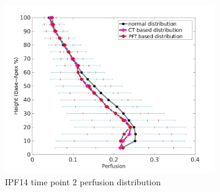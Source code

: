 \begin{figure}[htbp]
\begin{subfigure}{.6\linewidth}
  \includegraphics[width=\linewidth,trim={{.0\wd0} {.0\wd0} {.0\wd0} {.0\wd0}},clip]{Appendix/Image_AppexB/IPF1402/IPF1402_PerfusionAgainstLungHeight.png}
  \caption{IPF14 time point 2 perfusion distribution}
  \label{fig:IPF1402VQDistribution-b}
\end{subfigure}
\begin{subfigure}{.6\linewidth}%

\end{subfigure}
\end{figure}
